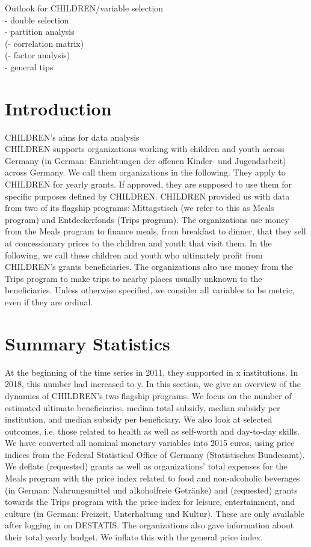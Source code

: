 \documentclass[12pt, a4paper]{article}\usepackage[]{graphicx}\usepackage[]{color}
\begin{document}
Outlook for CHILDREN/variable selection\\
- double selection \\
- partition analysis\\
(- correlation matrix)\\
(- factor analysis)\\
- general tips\\

\section{Introduction}

CHILDREN's aims for data analysis\\ 
CHILDREN supports organizations working with children and youth across Germany (in German: Einrichtungen der offenen Kinder- und Jugendarbeit) across Germany. We call them organizations in the following. They apply to CHILDREN for yearly grants. If approved, they are supposed to use them for specific purposes defined by CHILDREN. CHILDREN provided us with data from two of its flagship programs: Mittagstisch (we refer to this as Meals program) and Entdeckerfonds (Trips program). The organizations use money from the Meals program to finance meals, from breakfast to dinner, that they sell at concessionary prices to the children and youth that visit them. In the following, we call these children and youth who ultimately profit from CHILDREN's grants beneficiaries. The organizations also use money from the Trips program to make trips to nearby places usually unknown to the beneficiaries.  
Unless otherwise specified, we consider all variables to be metric, even if they are ordinal. 

\section{Summary Statistics}

At the beginning of the time series in 2011, they supported in x institutions. In 2018, this number had increased to y. In this section, we give an overview of the dynamics of CHILDREN's two flagship programs. We focus on the number of estimated ultimate beneficiaries, median total subsidy, median subsidy per institution, and median subsidy per beneficiary. We also look at selected outcomes, i.e. those related to health as well as self-worth and day-to-day skills. We have converted all nominal monetary variables into 2015 euros, using price indices from the Federal Statistical Office of Germany (Statistisches Bundesamt). We deflate (requested) grants as well as organizations' total expenses for the Meals program  with the price index related to food and non-alcoholic beverages (in German: Nahrungsmittel und alkoholfreie Getränke) and (requested) grants towards the Trips program with the price index for leisure, entertainment, and culture (in German: Freizeit, Unterhaltung und Kultur). These are only available after logging in on DESTATIS. The organizations also gave information about their total yearly budget. We inflate this with the general price index.    
\end{document}
